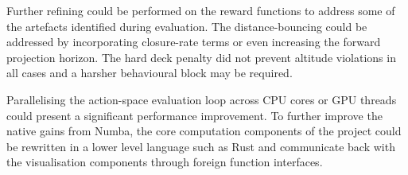 Further refining could be performed on the reward functions to address some of the artefacts identified during evaluation. The distance-bouncing could be addressed by incorporating closure-rate terms or even increasing the forward projection horizon. The hard deck penalty did not prevent altitude violations in all cases and a harsher behavioural block may be required.

Parallelising the action-space evaluation loop across CPU cores or GPU threads could present a significant performance improvement. To further improve the native gains from Numba, the core computation components of the project could be rewritten in a lower level language such as Rust and communicate back with the visualisation components through foreign function interfaces.